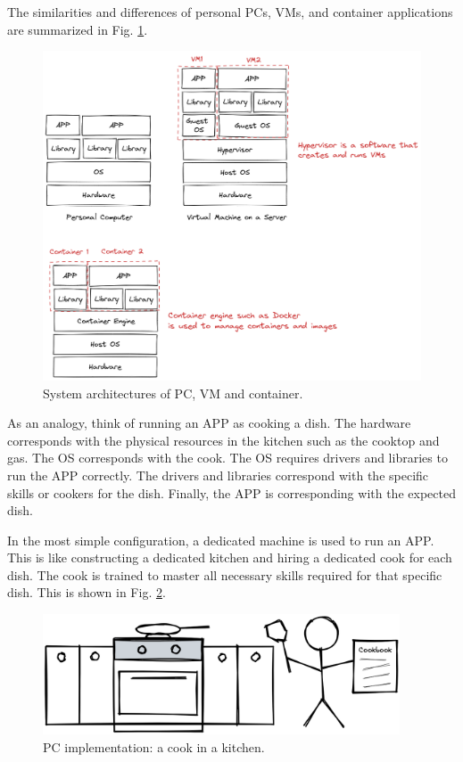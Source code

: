 The similarities and differences of personal PCs, VMs, and container applications are summarized in Fig. \ref{ch:vac:fig:pcvmcontainersructure}.

\begin{figure}[!htb]
	\centering
	\includegraphics[width=350pt]{chapters/part-3/figures/pcvmcontainerstructure.png}
	\caption{System architectures of PC, VM and container.} \label{ch:vac:fig:pcvmcontainersructure}
\end{figure}

As an analogy, think of running an APP as cooking a dish. The hardware corresponds with the physical resources in the kitchen such as the cooktop and gas. The OS corresponds with the cook. The OS requires drivers and libraries to run the APP correctly. The drivers and libraries correspond with the specific skills or cookers for the dish. Finally, the APP is corresponding with the expected dish.

In the most simple configuration, a dedicated machine is used to run an APP. This is like constructing a dedicated kitchen and hiring a dedicated cook for each dish. The cook is trained to master all necessary skills required for that specific dish. This is shown in Fig. \ref{ch:vac:fig:acookinakitchen}.
\begin{figure}[htbp]
	\centering
	\includegraphics[width=300pt]{chapters/part-3/figures/acookinakitchen.png}
	\caption{PC implementation: a cook in a kitchen.} \label{ch:vac:fig:acookinakitchen}
\end{figure}


